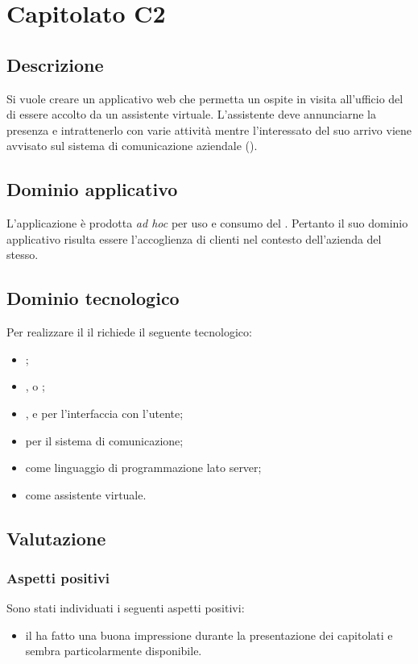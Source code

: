 \documentclass[../StudioDiFattibilita.tex]{subfiles}
\begin{document}
	\section{Capitolato C2}
		\subsection{Descrizione}
			Si vuole creare un applicativo web che permetta un ospite in visita all'ufficio del  di essere accolto da un assistente virtuale. L'assistente deve annunciarne la presenza e intrattenerlo con varie attività mentre l'interessato del suo arrivo viene avvisato sul sistema di comunicazione aziendale ().
		\subsection{Dominio applicativo}
			L'applicazione è prodotta \textit{ad hoc} per uso e consumo del . Pertanto il suo dominio applicativo risulta essere l'accoglienza di clienti nel contesto dell'azienda del  stesso.
		\subsection{Dominio tecnologico}
			Per realizzare il  il  richiede il seguente  tecnologico:
		\begin{itemize}
			\item \textbf{}; 
			\item \textbf{}, \textbf{} o \textbf{};
			\item \textbf{}, \textbf{} e \textbf{} per l'interfaccia con l'utente;
			\item \textbf{} per il sistema di comunicazione;
			\item \textbf{} \textbf{} come linguaggio di programmazione lato server;
			\item \textbf{} \textbf{} come assistente virtuale.
		\end{itemize}
		\subsection{Valutazione}
			\subsubsection{Aspetti positivi}
			Sono stati individuati i seguenti aspetti positivi:
			\begin{itemize}
				\item il  ha fatto una buona impressione durante la presentazione dei capitolati e sembra particolarmente disponibile.
			\end{itemize}
\end{document}
